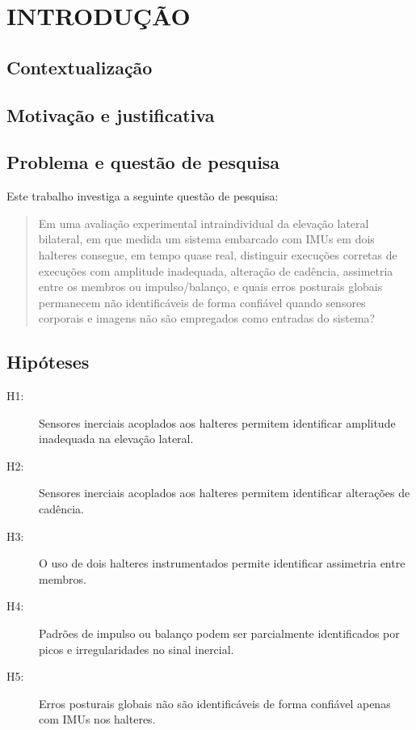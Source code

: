 \chapter{\MakeUppercase{Introdução}}
\label{cap:introducao}

\section{Contextualização}

\section{Motivação e justificativa}

\section{Problema e questão de pesquisa}

Este trabalho investiga a seguinte questão de pesquisa:

\begin{quote}
Em uma avaliação experimental intraindividual da elevação lateral bilateral, em que medida um sistema embarcado com IMUs em dois halteres consegue, em tempo quase real, distinguir execuções corretas de execuções com amplitude inadequada, alteração de cadência, assimetria entre os membros ou impulso/balanço, e quais erros posturais globais permanecem não identificáveis de forma confiável quando sensores corporais e imagens não são empregados como entradas do sistema?
\end{quote}

\section{Hipóteses}

\begin{description}
    \item[H1:] Sensores inerciais acoplados aos halteres permitem identificar
    amplitude inadequada na elevação lateral.

    \item[H2:] Sensores inerciais acoplados aos halteres permitem identificar
    alterações de cadência.

    \item[H3:] O uso de dois halteres instrumentados permite identificar
    assimetria entre membros.

    \item[H4:] Padrões de impulso ou balanço podem ser parcialmente
    identificados por picos e irregularidades no sinal inercial.

    \item[H5:] Erros posturais globais não são identificáveis de forma
    confiável apenas com IMUs nos halteres.
\end{description}

